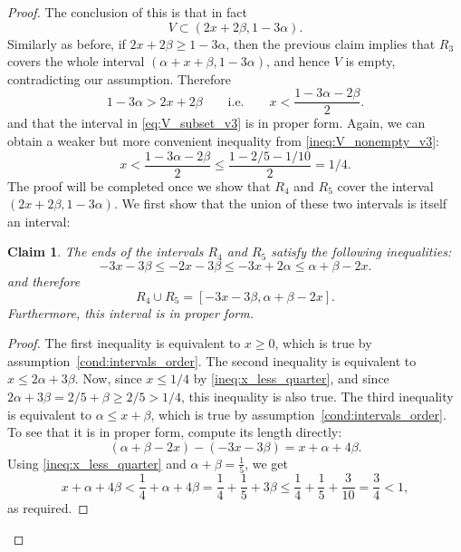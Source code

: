\documentclass{article}
\newtheorem{claim}{Claim}
\begin{document}
\begin{proof}
        The conclusion of this is that in fact 
        \begin{equation}
            V \subset (2x + 2\beta, 1 - 3\alpha). \label{eq:V_subset_v3}
        \end{equation}
        Similarly as before, if $2x + 2\beta \geq 1 - 3\alpha$, then the previous claim implies that $R_3$ covers the whole interval $(\alpha + x + \beta, 1 - 3\alpha)$,
        and hence $V$ is empty, contradicting our assumption.
        Therefore
        \begin{equation}
            1 - 3\alpha > 2x + 2\beta \qquad\text{i.e.}\qquad x < \frac{1 - 3\alpha - 2\beta}{2}.
            \label{ineq:V_nonempty_v3}
        \end{equation}
        and that the interval in \eqref{eq:V_subset_v3} is in proper form.
        Again, we can obtain a weaker but more convenient inequality from \eqref{ineq:V_nonempty_v3}:
        \begin{equation}
            x < \frac{1 - 3\alpha - 2\beta}{2} \leq \frac{1 - 2/5 - 1/10}{2} = 1/4. \label{ineq:x_less_quarter}
        \end{equation}
        The proof will be completed once we show that $R_4$ and $R_5$ cover the interval $(2x + 2\beta, 1 - 3\alpha)$.
        We first show that the union of these two intervals is itself an interval:
        \begin{claim}
            The ends of the intervals $R_4$ and $R_5$ satisfy the following inequalities:
            \[
                -3x - 3\beta \leq -2x - 3\beta \leq -3x + 2\alpha \leq \alpha + \beta - 2x.        
            \]
        and therefore 
        \begin{equation}
            R_4 \cup R_5 = [-3x - 3\beta, \alpha + \beta - 2x]. \label{eq:R4_union_R5}
        \end{equation}
        Furthermore, this interval is in proper form.
        \end{claim}
        \begin{proof}
            The first inequality is equivalent to $x \geq 0$, which is true by assumption~\eqref{cond:intervals_order}.
            The second inequality is equivalent to $x \leq 2\alpha + 3\beta$.
            Now, since $x \leq 1/4$ by \eqref{ineq:x_less_quarter}, and since $2\alpha + 3\beta = 2/5 + \beta \geq 2/5 > 1/4$, this inequality is also true.
            The third inequality is equivalent to $\alpha \leq x + \beta$, which is true by assumption~\eqref{cond:intervals_order}.
            To see that it is in proper form, compute its length directly:
            \[
                (\alpha + \beta - 2x) - (-3x - 3\beta) = x + \alpha + 4\beta.
            \]
            Using \eqref{ineq:x_less_quarter} and $\alpha + \beta = \frac{1}{5}$, we get
            \[
                x + \alpha + 4\beta < \frac{1}{4} + \alpha + 4\beta
                = \frac{1}{4} + \frac{1}{5} + 3\beta
                \leq \frac{1}{4} + \frac{1}{5} + \frac{3}{10}
                = \frac{3}{4} < 1,
            \]
            as required.
        \end{proof}


\end{proof}
\end{document}
